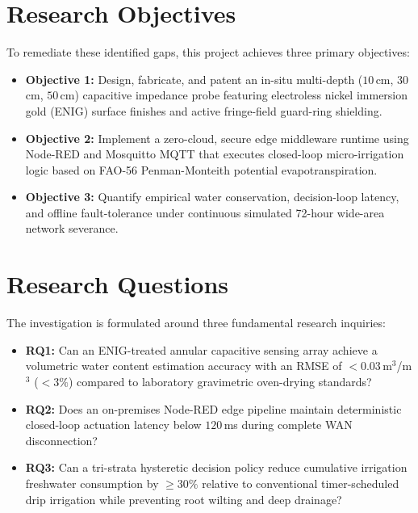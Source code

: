 \documentclass[journal,10pt,twocolumn]{IEEEtran}
\begin{document}
\section{Research Objectives}
To remediate these identified gaps, this project achieves three primary objectives:
\begin{itemize}
    \item \textbf{Objective 1:} Design, fabricate, and patent an in-situ multi-depth ($10$\,cm, $30$\,cm, $50$\,cm) capacitive impedance probe featuring electroless nickel immersion gold (ENIG) surface finishes and active fringe-field guard-ring shielding.
    \item \textbf{Objective 2:} Implement a zero-cloud, secure edge middleware runtime using Node-RED and Mosquitto MQTT that executes closed-loop micro-irrigation logic based on FAO-56 Penman-Monteith potential evapotranspiration.
    \item \textbf{Objective 3:} Quantify empirical water conservation, decision-loop latency, and offline fault-tolerance under continuous simulated 72-hour wide-area network severance.
\end{itemize}

\section{Research Questions}
The investigation is formulated around three fundamental research inquiries:
\begin{itemize}
    \item \textbf{RQ1:} Can an ENIG-treated annular capacitive sensing array achieve a volumetric water content estimation accuracy with an RMSE of $<0.03$\,m$^3$/m$^3$ ($<3\%$) compared to laboratory gravimetric oven-drying standards?
    \item \textbf{RQ2:} Does an on-premises Node-RED edge pipeline maintain deterministic closed-loop actuation latency below $120$\,ms during complete WAN disconnection?
    \item \textbf{RQ3:} Can a tri-strata hysteretic decision policy reduce cumulative irrigation freshwater consumption by $\ge 30\%$ relative to conventional timer-scheduled drip irrigation while preventing root wilting and deep drainage?
\end{itemize}
\end{document}
